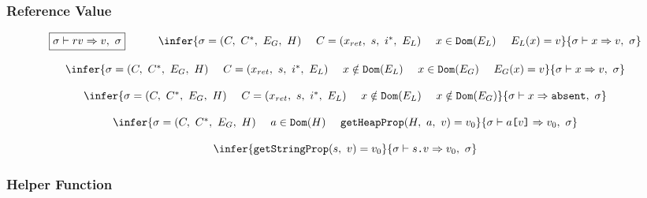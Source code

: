 \subsubsection{Reference Value}
\[
\begin{array}{c}
\multicolumn{1}{c}{\begin{array}{ccc}
\fbox{$\evalrefv{\symstate}{\symrefv}{v}{\symstate}$}
& \cs &
\infer
{\symstate = \symstatetuple{\symctx}{\symctxstack}{\symenv_G}{\symheap} \ \ \ \
\symctx = \symctxtuple{x_{ret}}{s}{i^*}{\symenv_L}\ \ \ \
x \in \Term{Dom}(\symenv_L)\ \ \ \
\symenv_L (x) = v }
{\evalrefv{\symstate}{x}{v}{\symstate}}
\end{array}}
\\ \\
\infer
{\symstate = \symstatetuple{\symctx}{\symctxstack}{\symenv_G}{\symheap} \ \ \ \
\symctx = \symctxtuple{x_{ret}}{s}{i^*}{\symenv_L}\ \ \ \
x \notin \Term{Dom}(\symenv_L)\ \ \ \
x \in \Term{Dom}(\symenv_G)\ \ \ \
\symenv_G (x) = v }
{\evalrefv{\symstate}{x}{v}{\symstate}}
\\ \\
\infer
{\symstate = \symstatetuple{\symctx}{\symctxstack}{\symenv_G}{\symheap} \ \ \ \
\symctx = \symctxtuple{x_{ret}}{s}{i^*}{\symenv_L}\ \ \ \
x \notin \Term{Dom}(\symenv_L)\ \ \ \
x \notin \Term{Dom}(\symenv_G)}
{\evalrefv{\symstate}{x}{\Term{absent}}{\symstate}}
\\ \\
\infer
{\symstate = \symstatetuple{\symctx}{\symctxstack}{\symenv_G}{\symheap} \ \ \ \
a \in \Term{Dom}(\symheap)\ \ \ \
\hgethprop{\symheap}{a}{v}{v_0}}
{\evalrefv{\symstate}{a\Term{[} v \Term{]}}{v_0}{\symstate}}
\\ \\
\infer
{\hgetsprop{s}{v}{v_0}}
{\evalrefv{\symstate}{s\Term{.}v}{v_0}{\symstate}}

\end{array}
\]

\newpage

\subsubsection{Helper Function}

